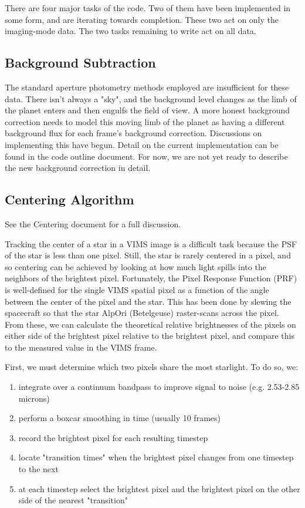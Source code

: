 \documentclass[12pt]{article}
\begin{document}
There are four major tasks of the code. Two of them have been implemented in
some form, and are iterating towards completion. These two act on only the
imaging-mode data. The two tasks remaining to write act on all data.

\subsection{Background Subtraction}

The standard aperture photometry methods employed are insufficient for these
data. There isn't always a "sky", and the background level changes as the limb
of the planet enters and then engulfs the field of view.  A more honest
background correction needs to model this moving limb of the planet as having a
different background flux for each frame's background correction. Discussions
on implementing this have begun. Detail on the current implementation can be
found in the code outline document. For now, we are not yet ready to describe
the new background correction in detail.

\subsection{Centering Algorithm}

See the Centering document for a full discussion.

Tracking the center of a star in a VIMS image is a difficult task because the
PSF of the star is less than one pixel. Still, the star is rarely centered in a
pixel, and so centering can be achieved by looking at how much light spills
into the neighbors of the brightest pixel. Fortunately, the Pixel Response
Function (PRF) is well-defined for the single VIMS spatial pixel as a function
of the angle between the center of the pixel and the star. This has been done
by slewing the spacecraft so that the star AlpOri (Betelgeuse) raster-scans
across the pixel. From these, we can calculate the theoretical relative
brightnesses of the pixels on either side of the brightest pixel relative to
the brightest pixel, and compare this to the measured value in the VIMS frame.


First, we must determine which two pixels share the most starlight. To do so,
we:
\begin{enumerate}
  \item integrate over a continuum bandpass to improve signal to noise (e.g. 2.53-2.85 microns)
  \item perform a boxcar smoothing in time (usually 10 frames)
  \item record the brightest pixel for each resulting timestep
  \item locate "transition times" when the brightest pixel changes from one timestep to the next
  \item at each timestep select the brightest pixel and the brightest pixel on the other side of the nearest "transition"
\end{enumerate}
\end{document}
